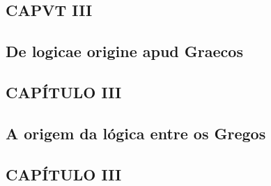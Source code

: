 \documentclass{article}
\begin{document}
\begin{paracol}{3}
  \begin{nthcolumn*}{0} %
    \subsection*{\centering CAPVT III}
    \subsection*{\centering De logicae origine apud Graecos} 
  \end{nthcolumn*}
  \vspace{0.5cm}
  \begin{nthcolumn}{1} %
    \subsection*{\centering CAPÍTULO III}
    \subsection*{\centering A origem da lógica entre os Gregos}
  \end{nthcolumn}
  \vspace{0.5cm}
  \begin{nthcolumn}{2} %
    \subsection*{\centering CAPÍTULO III}

\end{nthcolumn}
\end{paracol}
\end{document}
